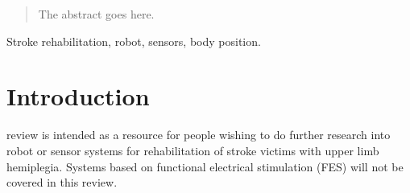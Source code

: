 \documentclass[journal]{IEEEtran}
\begin{document}







\maketitle


\begin{abstract}
The abstract goes here.
\end{abstract}

\begin{IEEEkeywords}
Stroke rehabilitation, robot, sensors, body position. %
\end{IEEEkeywords}






%
\IEEEpeerreviewmaketitle



\section{Introduction}
% 
% 
% 
% 
 review is intended as a resource for people wishing 
to do further research into robot or sensor systems for rehabilitation of 
stroke victims with upper limb hemiplegia. Systems based on functional electrical 
stimulation (FES) will not be covered in this review.
 
\end{document}
